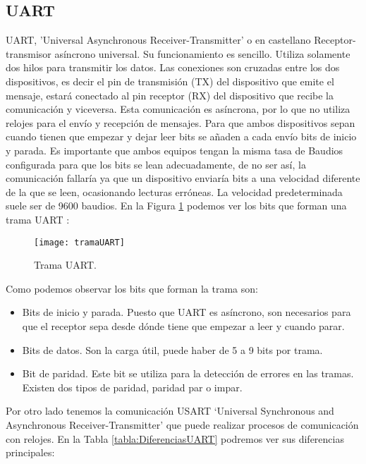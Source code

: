 \subsection{UART}
UART, 'Universal Asynchronous Receiver-Transmitter' o en castellano Receptor-transmisor asíncrono universal. Su funcionamiento es sencillo. Utiliza solamente dos hilos para transmitir los datos. Las conexiones son cruzadas entre los dos dispositivos, es decir el pin de transmisión (TX) del dispositivo que emite el mensaje, estará conectado al pin receptor (RX) del dispositivo que recibe la comunicación y viceversa. Esta comunicación es asíncrona, por lo que no utiliza relojes para el envío y recepción de mensajes. 
Para que ambos dispositivos sepan cuando tienen que empezar y dejar leer bits se añaden a cada envío bits de inicio y parada. Es importante que ambos equipos tengan la misma tasa de Baudios configurada para que los bits se lean adecuadamente, de no ser así, la comunicación fallaría ya que un dispositivo enviaría bits a una velocidad diferente de la que se leen, ocasionando lecturas erróneas. La velocidad predeterminada suele ser de 9600 baudios. En la Figura \ref{figTramaUart} podemos ver los bits que forman una trama UART \cite{queEsUART}:

\begin{figure}[!h]
	\centering
	\texttt{[image: tramaUART]}
	\caption{Trama UART.}\label{figTramaUart}
\end{figure}

Como podemos observar los bits que forman la trama son:
\begin{itemize}
\item Bits de inicio y parada. Puesto que UART es asíncrono, son necesarios para que el receptor sepa desde dónde tiene que empezar a leer y cuando parar.
\item Bits de datos. Son la carga útil, puede haber de 5 a 9 bits por trama. 
\item Bit de paridad. Este bit se utiliza para la detección de errores en las tramas. Existen dos tipos de paridad, paridad par o impar. 
\end{itemize}

Por otro lado tenemos la comunicación USART ‘Universal Synchronous and Asynchronous Receiver-Transmitter’ que puede realizar procesos de comunicación con relojes. En la Tabla \ref{tabla:DiferenciasUART} podremos ver sus diferencias \cite{DifUartUsart} principales:

